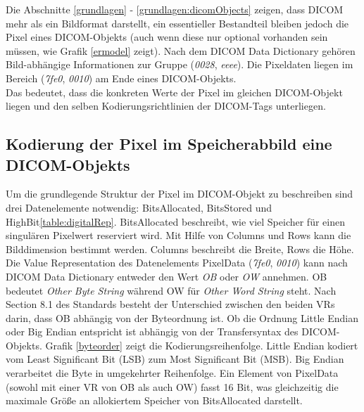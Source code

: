 Die Abschnitte \ref{grundlagen} - \ref{grundlagen:dicomObjects} zeigen, dass DICOM mehr als ein Bildformat darstellt, ein essentieller Bestandteil bleiben jedoch die Pixel eines DICOM-Objekts (auch wenn diese nur optional vorhanden sein müssen, wie Grafik \ref{ermodel} zeigt). Nach dem DICOM Data Dictionary gehören Bild-abhängige Informationen zur Gruppe (\textit{0028}, \textit{eeee}).
Die Pixeldaten liegen im Bereich (\textit{7fe0}, \textit{0010}) am Ende eines DICOM-Objekts.\\
Das bedeutet, dass die konkreten Werte der Pixel im gleichen DICOM-Objekt liegen und den selben Kodierungsrichtlinien der DICOM-Tags unterliegen.

\subsection{Kodierung der Pixel im Speicherabbild eine DICOM-Objekts} \label{pixelkodierung}

Um die grundlegende Struktur der Pixel im DICOM-Objekt zu beschreiben sind drei Datenelemente notwendig: BitsAllocated, BitsStored und HighBit\ref{table:digitalRep}. BitsAllocated beschreibt, wie viel Speicher für einen singulären Pixelwert reserviert wird. Mit Hilfe von Columns und Rows kann die Bilddimension bestimmt werden. Columns beschreibt die Breite, Rows die Höhe. Die Value Representation des Datenelements PixelData (\textit{7fe0}, \textit{0010}) kann nach DICOM Data Dictionary entweder den Wert \textit{OB} oder \textit{OW} annehmen. OB bedeutet \textit{Other Byte String} während OW für \textit{Other Word String} steht. Nach Section 8.1 des Standards\cite{dicom:structure} besteht der Unterschied zwischen den beiden VRs darin, dass OB abhängig von der Byteordnung ist. Ob die Ordnung Little Endian oder Big Endian entspricht ist abhängig von der Transfersyntax des DICOM-Objekts.
Grafik \ref{byteorder} zeigt die Kodierungsreihenfolge. Little Endian kodiert vom Least Significant Bit (LSB) zum Most Significant Bit (MSB). Big Endian verarbeitet die Byte in umgekehrter Reihenfolge. Ein Element von PixelData (sowohl mit einer VR von OB als auch OW) fasst 16 Bit, was gleichzeitig die maximale Größe an allokiertem Speicher von BitsAllocated darstellt.

